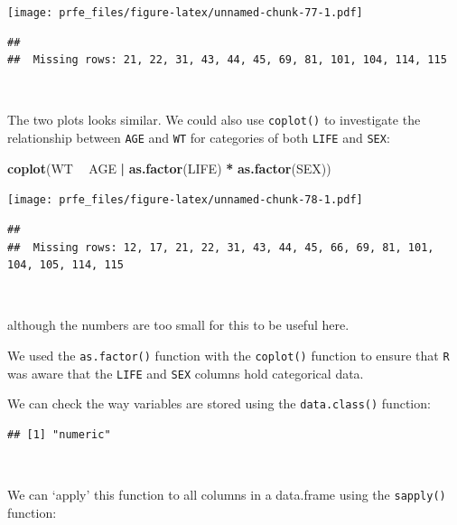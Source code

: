 \documentclass[12pt,a4paper]{book}
\newenvironment{Shaded}{\begin{snugshade}}{\end{snugshade}}
\newcommand{\KeywordTok}[1]{\textcolor[rgb]{0.13,0.29,0.53}{\textbf{#1}}}
\newcommand{\StringTok}[1]{\textcolor[rgb]{0.31,0.60,0.02}{#1}}
\newcommand{\OperatorTok}[1]{\textcolor[rgb]{0.81,0.36,0.00}{\textbf{#1}}}
\newcommand{\NormalTok}[1]{#1}
\theoremstyle{definition}
\theoremstyle{definition}
\theoremstyle{definition}
\theoremstyle{remark}
\begin{document}
\texttt{[image: prfe\_files/figure-latex/unnamed-chunk-77-1.pdf]}

\begin{verbatim}
## 
##  Missing rows: 21, 22, 31, 43, 44, 45, 69, 81, 101, 104, 114, 115
\end{verbatim}

~

The two plots looks similar. We could also use \texttt{coplot()} to
investigate the relationship between \texttt{AGE} and \texttt{WT} for
categories of both \texttt{LIFE} and \texttt{SEX}:

\begin{Shaded}
\begin{Highlighting}[]
\KeywordTok{coplot}\NormalTok{(WT }\OperatorTok{~}\StringTok{ }\NormalTok{AGE }\OperatorTok{|}\StringTok{ }\KeywordTok{as.factor}\NormalTok{(LIFE) }\OperatorTok{*}\StringTok{ }\KeywordTok{as.factor}\NormalTok{(SEX))}
\end{Highlighting}
\end{Shaded}

\texttt{[image: prfe\_files/figure-latex/unnamed-chunk-78-1.pdf]}

\begin{verbatim}
## 
##  Missing rows: 12, 17, 21, 22, 31, 43, 44, 45, 66, 69, 81, 101, 104, 105, 114, 115
\end{verbatim}

~

although the numbers are too small for this to be useful here.

We used the \texttt{as.factor()} function with the \texttt{coplot()}
function to ensure that \texttt{R} was aware that the \texttt{LIFE} and
\texttt{SEX} columns hold categorical data.

We can check the way variables are stored using the
\texttt{data.class()} function:

\begin{Shaded}
\end{Shaded}

\begin{verbatim}
## [1] "numeric"
\end{verbatim}

~

We can `apply' this function to all columns in a data.frame using the
\texttt{sapply()} function:
\end{document}
